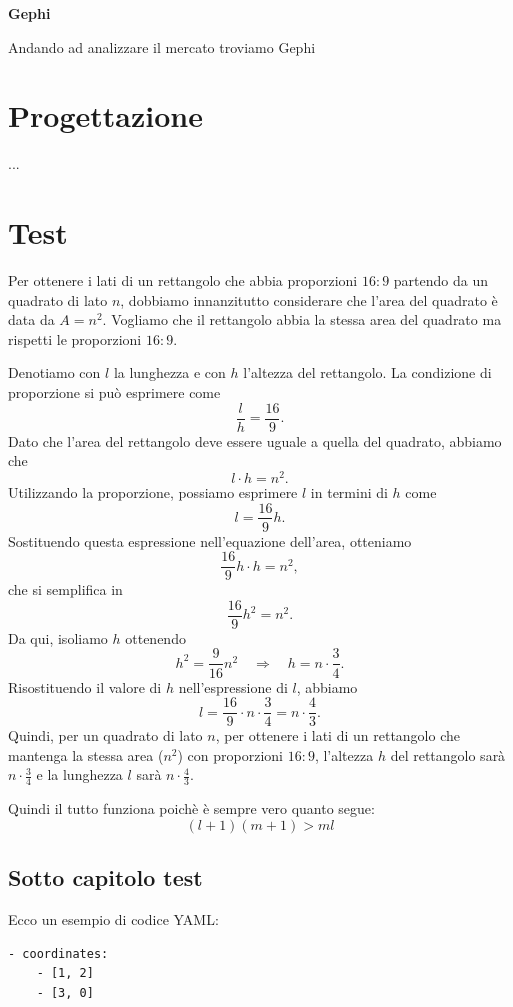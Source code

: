 \documentclass[binding=0.6cm]{sapthesis}
\begin{document}
\textbf{Gephi}

Andando ad analizzare il mercato troviamo Gephi \cite{Gephi2024}
\chapter{Progettazione}
...
\chapter{Test}
Per ottenere i lati di un rettangolo che abbia proporzioni $16:9$ partendo da un 
quadrato di lato $n$, dobbiamo innanzitutto considerare che l'area del quadrato è data 
da $A = n^2$. Vogliamo che il rettangolo abbia la stessa area del quadrato ma rispetti
 le proporzioni $16:9$.

Denotiamo con $l$ la lunghezza e con $h$ l'altezza del rettangolo. La condizione di proporzione si può esprimere come
\[
\frac{l}{h} = \frac{16}{9}.
\]
Dato che l'area del rettangolo deve essere uguale a quella del quadrato, abbiamo che
\[
l \cdot h = n^2.
\]
Utilizzando la proporzione, possiamo esprimere $l$ in termini di $h$ come
\[
l = \frac{16}{9}h.
\]
Sostituendo questa espressione nell'equazione dell'area, otteniamo
\[
\frac{16}{9}h \cdot h = n^2,
\]
che si semplifica in
\[
\frac{16}{9}h^2 = n^2.
\]
Da qui, isoliamo $h$ ottenendo
\[
h^2 = \frac{9}{16}n^2 \quad \Longrightarrow \quad h = n \cdot \frac{3}{4}.
\]
Risostituendo il valore di $h$ nell'espressione di $l$, abbiamo
\[
l = \frac{16}{9} \cdot n \cdot \frac{3}{4} = n \cdot \frac{4}{3}.
\]
Quindi, per un quadrato di lato $n$, per ottenere i lati di un rettangolo che mantenga la stessa area ($n^2$) con proporzioni $16:9$, l'altezza $h$ del rettangolo sarà $n \cdot \frac{3}{4}$ e la lunghezza $l$ sarà $n \cdot \frac{4}{3}$.



Quindi il tutto funziona poichè è sempre vero quanto segue:
\begin{equation}
(l+1)(m+1)>ml
\end{equation}

\section{Sotto capitolo test}

Ecco un esempio di codice YAML:

\begin{lstlisting}
- coordinates:
    - [1, 2]
    - [3, 0]
\end{lstlisting}
\end{document}

